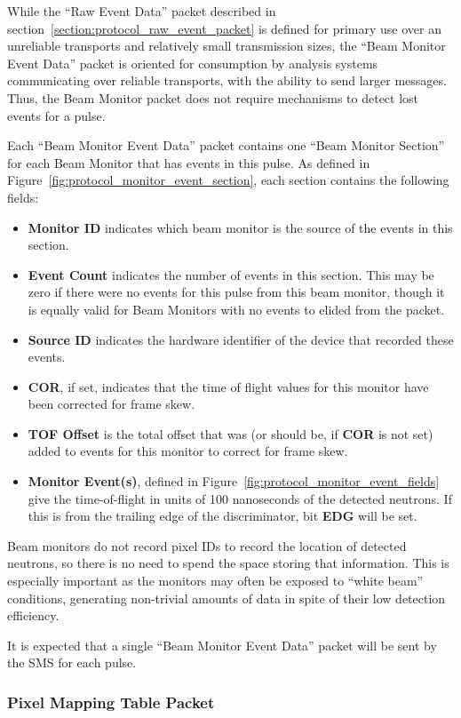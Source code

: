 While the ``Raw Event Data'' packet described in
section~\ref{section:protocol_raw_event_packet} is defined for primary use over
an unreliable transports and relatively small transmission sizes, the ``Beam
Monitor Event Data'' packet is oriented for consumption by analysis systems
communicating over reliable transports, with the ability to send larger
messages. Thus, the Beam Monitor packet does not require mechanisms to detect
lost events for a pulse.

Each ``Beam Monitor Event Data'' packet contains one ``Beam Monitor Section''
for each Beam Monitor that has events in this pulse. As defined in
Figure~\ref{fig:protocol_monitor_event_section}, each section contains the
following fields:
\begin{itemize}
\item{\bf Monitor ID} indicates which beam monitor is the source of the events
in this section.
\item{\bf Event Count} indicates the number of events in this section. This
may be zero if there were no events for this pulse from this beam monitor,
though it is equally valid for Beam Monitors with no events to elided from
the packet.
\item{\bf Source ID} indicates the hardware identifier of the device that
recorded these events.
\item{\bf COR}, if set, indicates that the time of flight values for this
monitor have been corrected for frame skew.
\item{\bf TOF Offset} is the total offset that was (or should be, if {\bf COR}
is not set) added to events for this monitor to correct for frame skew.
\item{\bf Monitor Event(s)}, defined in
Figure~\ref{fig:protocol_monitor_event_fields} give the time-of-flight in units
of 100 nanoseconds of the detected neutrons. If this is from the trailing edge
of the discriminator, bit {\bf EDG} will be set.
\end{itemize}

Beam monitors do not record pixel IDs to record the location of detected
neutrons, so there is no need to spend the space storing that information.
This is especially important as the monitors may often be exposed to ``white
beam'' conditions, generating non-trivial amounts of data in spite of their
low detection efficiency.

It is expected that a single ``Beam Monitor Event Data'' packet will be sent
by the SMS for each pulse.

\newpage
\subsubsection{Pixel Mapping Table Packet}
\label{section:protocol_pixel_mapping_table}

